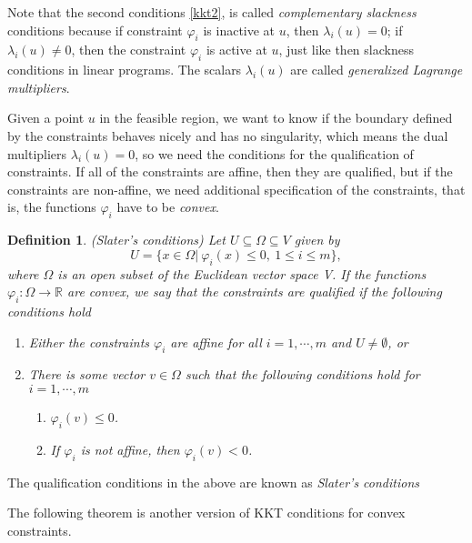 \documentclass[a4paper]{report}
\newtheorem{definition}{Definition}[section]
\begin{document}
Note that the second conditions \ref{kkt2}, is called \emph{complementary slackness} conditions because if constraint $\varphi_i$ is inactive at $u$, then $\lambda_i(u)=0$; if $\lambda_i(u)\neq 0$, then the constraint $\varphi_i$ is active at $u$, just like then slackness conditions in linear programs. The scalars $\lambda_i(u)$ are called \emph{generalized Lagrange multipliers}.

Given a point $u$ in the feasible region, we want to know if the boundary defined by the constraints behaves nicely and has no singularity, which means the dual multipliers $\lambda_i(u)=0$, so we need the conditions for the qualification of constraints. If all of the constraints are affine, then they are qualified, but if the constraints are non-affine, we need additional specification of the constraints, that is, the functions $\varphi_i$ have to be \emph{convex}.

\begin{definition}
    (Slater's conditions) Let $U\subseteq \Omega \subseteq V$ given by 
    \[
        U=\{x\in\Omega|\ \varphi_i(x)\leq 0,\ 1\leq i\leq m\},
    \]
    where $\Omega$ is an open subset of the Euclidean vector space V. If the functions $\varphi_i:\Omega\to \mathbb R$ are convex, we say that the constraints are \emph{qualified} if the following conditions hold
    \begin{enumerate}[label={(\alph*)}]
        \item Either the constraints $\varphi_i$ are affine for all $i=1,\cdots,m$ and $U\neq \emptyset $, or
        \item There is some vector $v\in \Omega$ such that the following conditions hold for $i=1,\cdots,m$
            \begin{enumerate}[label={(\roman*)}]
                \item $\varphi_i(v)\leq 0$.
                \item If $\varphi_i$ is not affine, then $\varphi_i(v)<0$.
            \end{enumerate}
    \end{enumerate}
\end{definition}

The qualification conditions in the above are known as \emph{Slater's conditions}

The following theorem is another version of KKT conditions for convex constraints.
\end{document}
